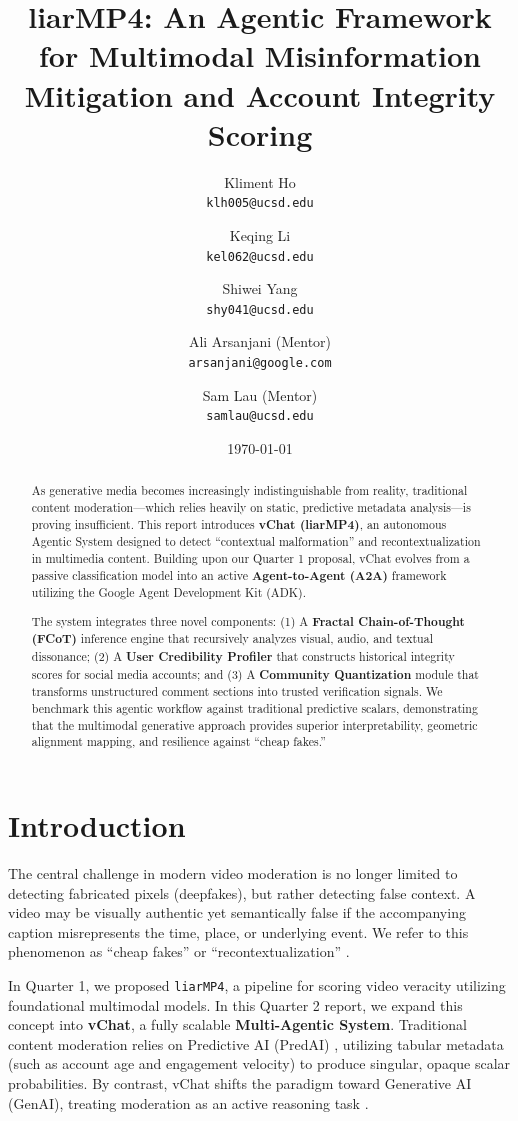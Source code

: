 \documentclass[12pt,letterpaper]{article}
\title{\textbf{liarMP4: An Agentic Framework for Multimodal Misinformation Mitigation and Account Integrity Scoring}}
\author{
  Kliment Ho \\
  \texttt{klh005@ucsd.edu} \and
  Keqing Li \\
  \texttt{kel062@ucsd.edu} \and
  Shiwei Yang \\
  \texttt{shy041@ucsd.edu} \and
  Ali Arsanjani (Mentor) \\
  \texttt{arsanjani@google.com} \and
  Sam Lau (Mentor) \\
  \texttt{samlau@ucsd.edu}
}
\date{\today}
\begin{document}
\maketitle

\begin{abstract}
As generative media becomes increasingly indistinguishable from reality, traditional content moderation—which relies heavily on static, predictive metadata analysis—is proving insufficient. This report introduces \textbf{vChat (liarMP4)}, an autonomous Agentic System designed to detect ``contextual malformation'' and recontextualization in multimedia content. Building upon our Quarter 1 proposal, vChat evolves from a passive classification model into an active \textbf{Agent-to-Agent (A2A)} framework utilizing the Google Agent Development Kit (ADK).

The system integrates three novel components: (1) A \textbf{Fractal Chain-of-Thought (FCoT)} inference engine that recursively analyzes visual, audio, and textual dissonance; (2) A \textbf{User Credibility Profiler} that constructs historical integrity scores for social media accounts; and (3) A \textbf{Community Quantization} module that transforms unstructured comment sections into trusted verification signals. We benchmark this agentic workflow against traditional predictive scalars, demonstrating that the multimodal generative approach provides superior interpretability, geometric alignment mapping, and resilience against ``cheap fakes.''
\end{abstract}

\tableofcontents
\newpage

\section{Introduction}

The central challenge in modern video moderation is no longer limited to detecting fabricated pixels (deepfakes), but rather detecting false context. A video may be visually authentic yet semantically false if the accompanying caption misrepresents the time, place, or underlying event. We refer to this phenomenon as ``cheap fakes'' or ``recontextualization'' \cite{zhao2024vidl}.

In Quarter 1, we proposed \texttt{liarMP4}, a pipeline for scoring video veracity utilizing foundational multimodal models. In this Quarter 2 report, we expand this concept into \textbf{vChat}, a fully scalable \textbf{Multi-Agentic System}. Traditional content moderation relies on Predictive AI (PredAI) \cite{al2022multi}, utilizing tabular metadata (such as account age and engagement velocity) to produce singular, opaque scalar probabilities. By contrast, vChat shifts the paradigm toward Generative AI (GenAI), treating moderation as an active reasoning task \cite{wei2022chain}.
\end{document}
